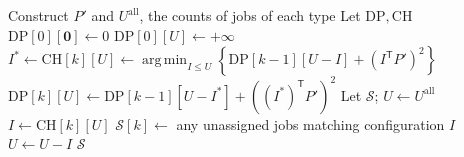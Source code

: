 \documentclass[12pt,a4paper]{article}
\begin{document}
\begin{algorithm}[htbp]
\caption{$\textit{Exact-Scheduling}_C(\mathcal{I})$}
\begin{algorithmic}
\State Construct $P'$ and $U^{\mathrm{all}}$, the counts of jobs of each type
\State Let $\mathrm{DP},\mathrm{CH}$
\State $\mathrm{DP}[0][\mathbf{0}]\gets0$
\State $\mathrm{DP}[0][U]\gets+\infty$
\EndFor
{}
\State $I^*\gets\mathrm{CH}[k][U]\gets\displaystyle\operatorname*{arg\,min}_{I\leq U}\left\{\mathrm{DP}[k-1][U-I]+(I^{\mathsf T}P')^2\right\}$
\State $\mathrm{DP}[k][U]\gets\mathrm{DP}[k-1][U-I^*]+((I^*)^{\mathsf T}P')^2$
\EndFor
\EndFor
\State Let $\mathcal{S}$; $U\gets U^{\mathrm{all}}$
\State $I\gets\mathrm{CH}[k][U]$
\State $\mathcal{S}[k]\gets$ any unassigned jobs matching configuration $I$
\State $U\gets U-I$
\EndFor
\State \Return $\mathcal{S}$
\end{algorithmic}
\end{algorithm}
\end{document}
